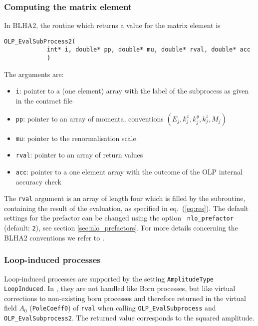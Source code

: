 \subsubsection{Computing the matrix element}
In BLHA2, the routine which returns a value for the matrix element is
\begin{lstlisting}[style=C]
      OLP_EvalSubProcess2(
            int* i, double* pp, double* mu, double* rval, double* acc
            )
\end{lstlisting}
The arguments are:
\begin{itemize}
\item \texttt{i}: pointer to a (one element) array with the label of the subprocess as given in the contract file
\item \texttt{pp}: pointer to an array of momenta, conventions $(E_j,k_j^x,k_j^y,k_j^z,M_j)$
\item \texttt{mu}: pointer to the renormalisation scale 
\item \texttt{rval}: pointer to an array of return values
\item \texttt{acc}: pointer to a one element array with the outcome of the 
OLP internal accuracy check 
\end{itemize}
The \texttt{rval} argument is an array of length four which is filled by the subroutine, containing the result of the evaluation, as specified in eq.~(\ref{eq:res}). The default settings for the prefactor can be changed using the option \texttt{ nlo\_prefactor} (default: \texttt{2}), see section \ref{sec:nlo_prefactors}. For more details concerning the BLHA2 conventions we refer to \cite{Alioli:2013nda}.


\subsubsection{Loop-induced processes}
Loop-induced processes are supported by the setting \lstinline[style=sh]|AmplitudeType LoopInduced|. In \gosam, they are not handled like Born processes, but like virtual corrections to non-existing born processes and therefore returned in the virtual field $A_0$ (\texttt{PoleCoeff0}) of \texttt{rval} when calling \texttt{OLP\_EvalSubprocess} and \texttt{OLP\_EvalSubprocess2}. The returned value corresponds to the  squared amplitude.




